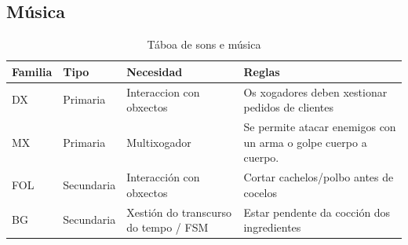 \documentclass{report}  %
\begin{document}
\subsection{Música}

\begin{table}[h]
    \centering
    \renewcommand{\arraystretch}{1.3} %
    \setlength{\tabcolsep}{10pt} %
    \label{tab:mecanicas}
    \begin{tabular}{|p{4cm}|p{2cm}|p{3cm}|p{4cm}|}
        \hline
        \rowcolor{octopus} %
        \textbf{Familia}  & \textbf{Tipo} & \textbf{Necesidad} & \textbf{Reglas} \\
        \hline
        DX  & Primaria  & Interaccion con obxectos  & Os xogadores deben xestionar pedidos de clientes \\
        \hline
        MX  & Primaria  & Multixogador    & Se permite atacar enemigos con un arma o golpe cuerpo a cuerpo. \\
        \hline
        FOL  & Secundaria & Interacción con obxectos & Cortar cachelos/polbo antes de cocelos \\
        \hline
        BG & Secundaria & Xestión do transcurso do tempo / FSM & Estar pendente da cocción dos ingredientes \\
        \hline

    \end{tabular}
    \caption{Táboa de sons e música}
\end{table}
\end{document}

